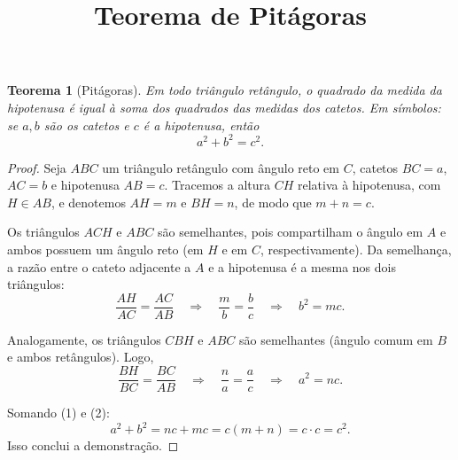 \documentclass[12pt,a4paper]{article}
\title{Teorema de Pitágoras}
\author{}
\date{}
\newtheorem{theorem}{Teorema}[section]
\begin{document}
\maketitle

\begin{theorem}[Pitágoras]
Em todo triângulo retângulo, o quadrado da medida da hipotenusa é igual
à soma dos quadrados das medidas dos catetos. Em símbolos: se $a,b$ são
os catetos e $c$ é a hipotenusa, então
\[
  a^{2} + b^{2} = c^{2}.
\]
\end{theorem}

\begin{proof}
Seja $ABC$ um triângulo retângulo com ângulo reto em $C$, catetos
$BC=a$, $AC=b$ e hipotenusa $AB=c$. Tracemos a altura $CH$ relativa
à hipotenusa, com $H \in AB$, e denotemos $AH=m$ e $BH=n$, de modo que
$m+n=c$.

Os triângulos $ACH$ e $ABC$ são semelhantes, pois compartilham o ângulo
em $A$ e ambos possuem um ângulo reto (em $H$ e em $C$, respectivamente).
Da semelhança, a razão entre o cateto adjacente a $A$ e a hipotenusa
é a mesma nos dois triângulos:
\[
  \frac{AH}{AC} = \frac{AC}{AB}
  \quad\Longrightarrow\quad
  \frac{m}{b} = \frac{b}{c}
  \quad\Longrightarrow\quad
  b^{2} = mc. \tag{1}
\]

Analogamente, os triângulos $CBH$ e $ABC$ são semelhantes (ângulo comum
em $B$ e ambos retângulos). Logo,
\[
  \frac{BH}{BC} = \frac{BC}{AB}
  \quad\Longrightarrow\quad
  \frac{n}{a} = \frac{a}{c}
  \quad\Longrightarrow\quad
  a^{2} = nc. \tag{2}
\]

Somando (1) e (2):
\[
  a^{2}+b^{2} = nc + mc = c(m+n) = c\cdot c = c^{2}.
\]
Isso conclui a demonstração.
\end{proof}
\end{document}
